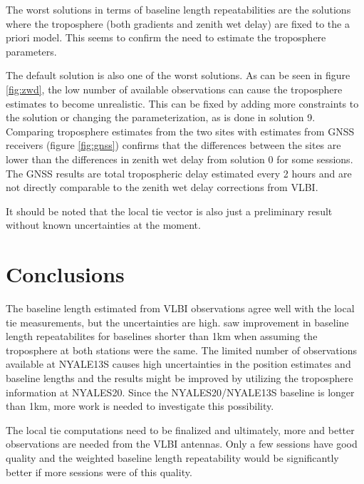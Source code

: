 \documentclass[natbib,twocolumn,twoside]{svmultiag}
\begin{document}
The worst solutions in terms of baseline length repeatabilities are the solutions where the troposphere (both
gradients and zenith wet delay) are fixed to the a priori model. This seems to confirm the need to estimate
the troposphere parameters. 

The default solution is also one of the worst solutions. As can be seen in figure \ref{fig:zwd}, the low number of 
available
observations can cause the troposphere estimates to become unrealistic. This can be fixed by adding more constraints
to the solution or changing the parameterization, as is done in solution 9. Comparing troposphere estimates from the two
sites with estimates from GNSS receivers (figure \ref{fig:gnss}) confirms that the differences between the sites are lower than the 
differences in zenith wet delay from solution 0 for some sessions. The GNSS results are total tropospheric delay estimated 
every 2 hours and are not directly comparable to the zenith wet delay corrections from VLBI.    
 
It should be noted that the local tie vector is also just a preliminary result without known uncertainties at the moment. 


\section{Conclusions} 

The baseline length estimated from VLBI observations agree well with the local tie measurements, but the uncertainties are
high. \cite{nilsson2015} saw improvement in baseline length repeatabilites
for baselines shorter than 1km when assuming the troposphere at both stations were the same. The limited number of
observations available at NYALE13S causes high uncertainties in the position estimates and baseline lengths 
and the results might be improved by utilizing the troposphere information at NYALES20. Since the NYALES20/NYALE13S baseline
is longer than 1km, more work is needed to investigate this possibility.

The local tie computations need to be finalized and ultimately, more and better observations are needed
from the VLBI antennas. Only a few sessions have good quality and the weighted baseline
length repeatability would be significantly better if more sessions were of this quality. 
\end{document}
